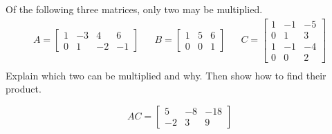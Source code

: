 
\begin{exerciseStatement}


Of the following three matrices, only two may be multiplied. 
\begin{align*} A= \left[\begin{array}{cccc}
1 & -3 & 4 & 6 \\
0 & 1 & -2 & -1
\end{array}\right]  & & B= \left[\begin{array}{ccc}
1 & 5 & 6 \\
0 & 0 & 1
\end{array}\right]  & & C= \left[\begin{array}{ccc}
1 & -1 & -5 \\
0 & 1 & 3 \\
1 & -1 & -4 \\
0 & 0 & 2
\end{array}\right]  \\ \end{align*}
             Explain which two can be multiplied and why. Then show how to find their product.


\end{exerciseStatement}
    
\begin{exerciseAnswer} 
\[AC= \left[\begin{array}{ccc}
5 & -8 & -18 \\
-2 & 3 & 9
\end{array}\right] \]
\end{exerciseAnswer}
    
